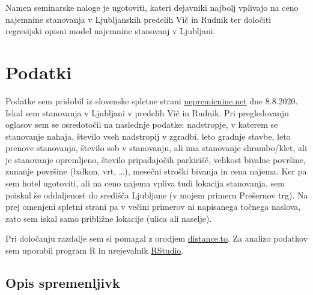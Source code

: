\documentclass[a4paper, 12pt]{article}
\begin{document}
Namen seminarske naloge je ugotoviti, kateri dejavniki najbolj vplivajo na ceno
najemnine stanovanja v Ljubljanskih predelih Vič in Rudnik ter določiti
regresijski opisni model najemnine stanovanj v Ljubljani.

\section{Podatki}

Podatke sem pridobil iz slovenske spletne strani
\href{https://www.nepremicnine.net}{nepremicnine.net} dne 8.8.2020.
Iskal sem stanovanja v Ljubljani v predelih Vič in Rudnik.
Pri pregledovanju oglasov sem se osredotočil na naslednje podatke:
nadstropje, v katerem se stanovanje nahaja, število vseh nadstropij v zgradbi,
leto gradnje stavbe, leto prenove stanovanja, število sob v stanovanju,
ali ima stanovanje shrambo/klet, ali je stanovanje opremljeno, število
pripadajočih parkirišč, velikost bivalne površine, zunanje površine
(balkon, vrt, \dots), mesečni stroški bivanja in cena najema. Ker pa sem hotel
ugotoviti, ali na ceno najema vpliva tudi lokacija stanovanja, sem poiskal še
oddaljenost do središča Ljubljane (v mojem primeru Prešernov trg). Na prej
omenjeni spletni strani pa v večini primerov ni napisanega točnega naslova,
zato sem iskal samo približne lokacije (ulica ali naselje).

Pri določanju razdalje sem si pomagal z orodjem
\href{https://www.distance.to/}{distance.to}. Za analizo podatkov sem uporabil
program R in urejevalnik \href{https://rstudio.com/}{RStudio}.

\newpage
\subsection{Opis spremenljivk}
\end{document}
